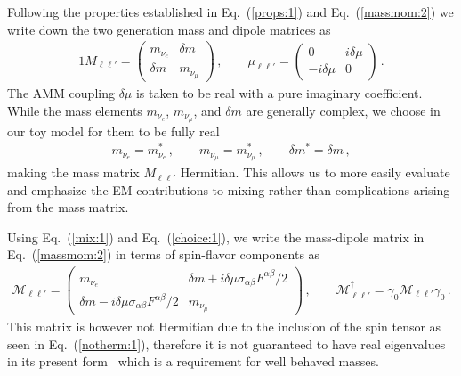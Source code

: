 \documentclass[addchapnum]{ws-rv961x669} %
\newcommand{\req}[1]{Eq.~(\ref{#1})}
\begin{document}
Following the properties established in \req{props:1} and \req{massmom:2} we write down the two generation mass and dipole matrices as
\begin{alignat}{1}
	\label{mix:1} M_{\ell\ell'}= 
	\begin{pmatrix}
		m_{\nu_{e}} & {\delta m}\\
		{\delta m} & m_{\nu_{\mu}}
	\end{pmatrix}\,,\qquad
	\mu_{\ell\ell'} = 
	\begin{pmatrix}
		0 & i\delta\mu\\
		-i\delta\mu & 0
	\end{pmatrix}\,.
\end{alignat}
The AMM coupling $\delta\mu$ is taken to be real with a pure imaginary coefficient. While the mass elements $m_{\nu_{e}}$, $m_{\nu_{\mu}}$, and ${\delta m}$ are generally complex, we choose in our toy model for them to be fully real
\begin{align}
    \label{choice:1}
    m_{\nu_{e}}=m_{\nu_{e}}^{*}\,,\qquad
    m_{\nu_{\mu}}=m_{\nu_{\mu}}^{*}\,,\qquad
    \delta m^{*}=\delta m\,,
\end{align}
making the mass matrix $M_{\ell\ell'}$ Hermitian. This allows us to more easily evaluate and emphasize the EM contributions to mixing rather than complications arising from the mass matrix.

Using \req{mix:1} and \req{choice:1}, we write the mass-dipole matrix in \req{massmom:2} in terms of spin-flavor components as
\begin{align}
	\label{mix:2}
    \mathcal{M}_{\ell\ell'} = 
	\begin{pmatrix}
		m_{\nu_{e}} & {\delta m}+i\delta\mu\sigma_{\alpha\beta}F^{\alpha\beta}/2\\
		{\delta m}-i\delta\mu\sigma_{\alpha\beta}F^{\alpha\beta}/2 & m_{\nu_{\mu}}
	\end{pmatrix}\,,\qquad
    \mathcal{M}_{\ell\ell'}^{\dag}=\gamma_{0}\mathcal{M}_{\ell\ell'}\gamma_{0}\,.
\end{align}
This matrix is however not Hermitian due to the inclusion of the spin tensor as seen in \req{notherm:1}, therefore it is not guaranteed to have real eigenvalues in its present form~\cite{arfken2011mathematical} which is a requirement for well behaved masses.
\end{document}
